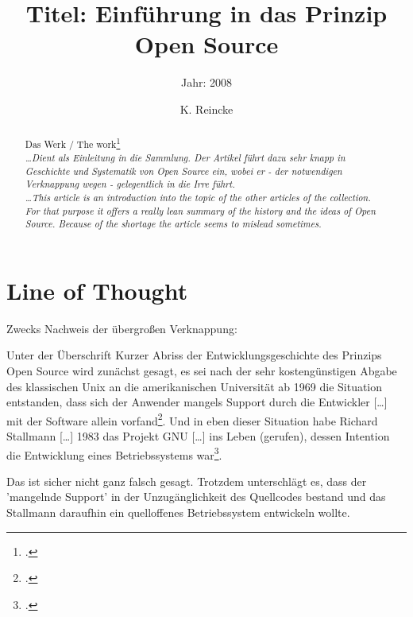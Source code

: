 \documentclass[DIV=calc,BCOR=5mm,11pt,headings=small,oneside,abstract=true, toc=bib]{scrartcl}
\begin{document}

\titlehead{Literaturexzerpt}
\subject{Autor(en): Seel und Kraft}
\title{Titel: Einführung in das Prinzip Open Source}
\subtitle{Jahr: 2008 }
\author{K. Reincke}

\maketitle

\begin{abstract}
\noindent

Das Werk / The work\footcite[][]{SeeKra2008a} \\
\noindent \itshape
\ldots Dient als Einleitung in die Sammlung. Der Artikel führt dazu sehr knapp
in Geschichte und Systematik von Open Source ein, wobei er - der notwendigen
Verknappung wegen - gelegentlich in die Irre führt. \\
\noindent
\ldots This article is an introduction into the topic of the other articles of
the collection. For that purpose it offers a really lean summary of the history
and the ideas of Open Source. Because of the shortage the article seems to
mislead sometimes.
\end{abstract}
\footnotesize
\normalsize 

\section{Line of Thought}
Zwecks Nachweis der übergroßen Verknappung:

Unter der Überschrift \glqq{}Kurzer Abriss der Entwicklungsgeschichte des
Prinzips Open Source\grqq{} wird zunächst gesagt, es sei nach der sehr
kostengünstigen Abgabe des klassischen Unix an die amerikanischen Universität ab
1969 die Situation entstanden, dass sich der \glqq{}Anwender\grqq{} mangels
Support durch die Entwickler \glqq{}[\ldots] mit der Software allein
vorfand\grqq{}\footcite[vgl.][12]{SeeKra2008a}. Und in eben dieser Situation
habe Richard Stallmann \glqq{}[\ldots] 1983 das Projekt GNU [\ldots] ins
Leben (gerufen), dessen Intention die Entwicklung eines Betriebssystems
war\grqq{}\footcite[vgl.][12]{SeeKra2008a}.

Das ist sicher nicht ganz falsch gesagt. Trotzdem unterschlägt es, dass der
'mangelnde Support' in der Unzugänglichkeit des Quellcodes bestand und das
Stallmann daraufhin ein quelloffenes Betriebssystem entwickeln wollte.
\end{document}
